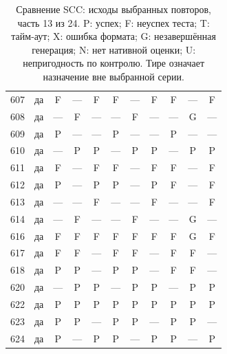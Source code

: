 \begin{table}[p]
\begin{tabular*}{\textwidth}{@{\extracolsep{\fill}}rc*{9}{c}@{}}
607 & да & F & — & F & F & — & F & F & — & F\\
608 & да & — & F & — & — & F & — & — & G & —\\
609 & да & P & — & — & P & — & — & P & — & —\\
610 & да & — & P & P & — & P & P & — & P & P\\
611 & да & F & — & F & F & — & F & F & — & F\\
612 & да & P & — & P & P & — & P & F & — & F\\
613 & да & — & — & F & — & — & F & — & — & F\\
614 & да & — & F & — & — & F & — & — & G & —\\
616 & да & F & F & F & F & F & F & F & G & F\\
617 & да & F & F & — & F & F & — & F & F & —\\
618 & да & P & P & — & P & P & — & F & F & —\\
620 & да & — & P & P & — & P & P & — & P & P\\
622 & да & P & P & P & P & P & P & P & P & P\\
623 & да & P & P & — & P & P & — & P & P & —\\
624 & да & P & — & P & P & — & P & P & — & P\\
\bottomrule\end{tabular*}
\caption{Сравнение SCC: исходы выбранных повторов, часть 13 из 24. P: успех; F: неуспех теста; T: тайм-аут; X: ошибка формата; G: незавершённая генерация; N: нет нативной оценки; U: непригодность по контролю. Тире означает назначение вне выбранной серии.}
\end{table}
\clearpage
